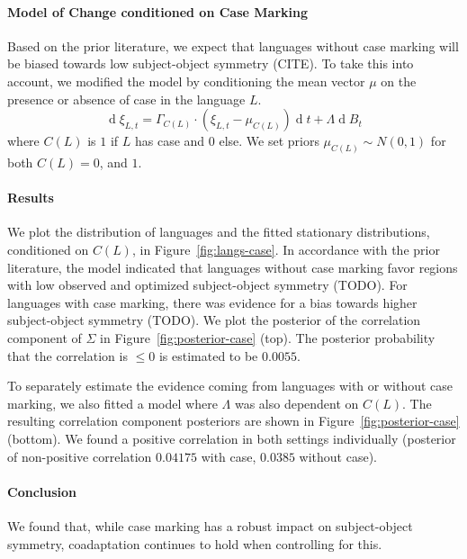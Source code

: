 \documentclass[11pt,a4paper]{article}
\begin{document}
\paragraph{Model of Change conditioned on Case Marking}
Based on the prior literature, we expect that languages without case marking will be biased towards low subject-object symmetry (CITE).
To take this into account, we modified the model by conditioning the mean vector $\mu$ on the presence or absence of case in the language $L$.
\begin{equation*}
    \operatorname{d}\xi_{L,t} = \Gamma_{C(L)} \cdot (\xi_{L,t}-\mu_{C(L)}) \operatorname{d}t + \Lambda \operatorname{d}B_t
\end{equation*}
where $C(L)$ is $1$ if $L$ has case and $0$ else.
We set priors $\mu_{C(L)} \sim N(0,1)$ for both $C(L) = 0$, and $1$.


\paragraph{Results}
We plot the distribution of languages and the fitted stationary distributions, conditioned on $C(L)$, in Figure~\ref{fig:langs-case}.
In accordance with the prior literature, the model indicated that languages without case marking favor regions with low observed and optimized subject-object symmetry (TODO).
For languages with case marking, there was evidence for a bias towards higher subject-object symmetry (TODO).
We plot the posterior of the correlation component of $\Sigma$ in Figure~\ref{fig:posterior-case} (top).
The posterior probability that the correlation is $\leq 0$ is estimated to be $0.0055$.

To separately estimate the evidence coming from languages with or without case marking, we also fitted a model where $\Lambda$ was also dependent on $C(L)$.
The resulting correlation component posteriors are shown in Figure~\ref{fig:posterior-case} (bottom).
We found a positive correlation in both settings individually (posterior of non-positive correlation $0.04175$ with case, $0.0385$ without case).

\paragraph{Conclusion}
We found that, while case marking has a robust impact on subject-object symmetry, coadaptation continues to hold when controlling for this.
\end{document}
